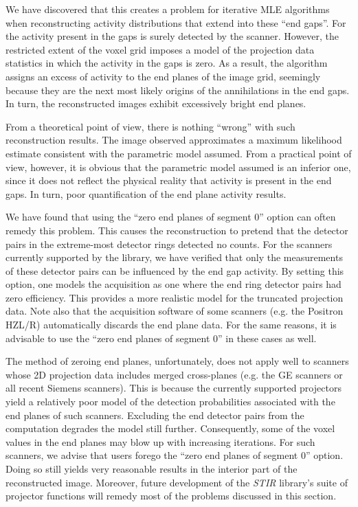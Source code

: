 \documentclass{article}
\begin{document}
We have discovered that this creates a problem for iterative 
MLE algorithms when reconstructing activity distributions that 
extend into these ``end gaps''. For the activity present in the 
gaps is surely detected by the scanner. However, the restricted 
extent of the voxel grid imposes a model of the projection data 
statistics in which the activity in the gaps is zero. As a result, 
the algorithm assigns an excess of activity to the end planes 
of the image grid, seemingly because they are the next most likely 
origins of the annihilations in the end gaps. In turn, the reconstructed 
images exhibit excessively bright end planes.



From a theoretical point of view, there is nothing ``wrong'' with 
such reconstruction results. The image observed approximates 
a maximum likelihood estimate consistent with the parametric 
model assumed. From a practical point of view, however, it is 
obvious that the parametric model assumed is an inferior one, 
since it does not reflect the physical reality that activity 
is present in the end gaps. In turn, poor quantification of the 
end plane activity results. 



We have found that using the ``zero end planes of segment 0'' 
option can often remedy this problem. This causes the reconstruction 
to pretend that the detector pairs in the extreme-most detector 
rings detected no counts. For the scanners currently supported 
by the library, we have verified that only the measurements of 
these detector pairs can be influenced by the end gap activity. 
By setting this option, one models 
the acquisition as one where the end ring detector pairs had 
zero efficiency. This provides a more realistic model for the 
truncated projection data. Note also that the acquisition software 
of some scanners (e.g. the Positron HZL/R) automatically discards 
the end plane data. For the same reasons, it is advisable to 
use the ``zero end planes of segment 0'' in these cases as well.



The method of zeroing end planes, unfortunately, does not apply 
well to scanners whose 2D projection data includes merged cross-planes 
(e.g. the GE scanners or all recent Siemens scanners). 
This is because the currently supported 
projectors yield a relatively poor model of the detection probabilities 
associated with the end planes of such scanners. Excluding the 
end detector pairs from the computation degrades the model still 
further. Consequently, some of the voxel values in the end planes 
may blow up with increasing iterations. For such scanners, we 
advise that users forego the ``zero end planes of segment 0'' 
option. Doing so still yields very reasonable results in the 
interior part of the reconstructed image. Moreover, future development 
of the \textit{STIR} library's suite of projector functions will remedy 
most of the problems discussed in this section.
\end{document}
